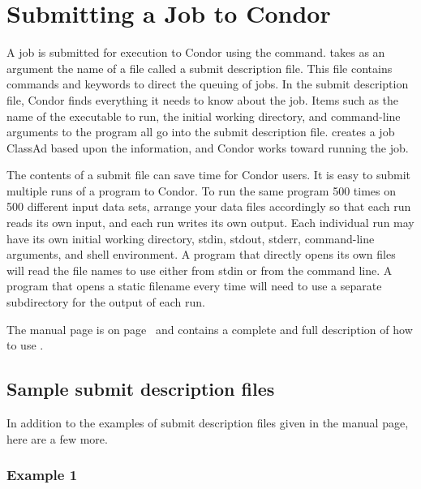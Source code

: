 \section{Submitting a Job to Condor}

A job is submitted for execution to Condor using the
 command.
 takes as an argument the name of a
file called a submit description file.
This file contains commands and keywords to direct the queuing of jobs.
In the submit description file, Condor finds everything it needs
to know about the job.  Items such as the name of the executable to run,
the initial working directory, and command-line arguments to the
program all go into
the submit description file.   creates a job
ClassAd based upon the information,
and Condor
works toward running the job.

The contents of a submit file
can save time for Condor users.
It is easy to submit multiple runs of a program to
Condor. To run the same program 500 times on 500
different input data sets, arrange your data files
accordingly so that each run reads its own input, and each run
writes its own output.
Each individual run may have its own initial
working directory, stdin, stdout, stderr, command-line arguments, and
shell environment.
A program that directly opens its own
files will read the file names to use either from stdin
or from the command line. 
A program that opens a static filename every time
will need to use a separate subdirectory for the output of each run.

The  manual page 
is on page~\pageref{man-condor-submit} and
contains a complete and full description of how to use .

\subsection{Sample submit description files}  

In addition to the examples of submit description files given
in the 
 manual page, here are a few more.

\subsubsection{Example 1} 

